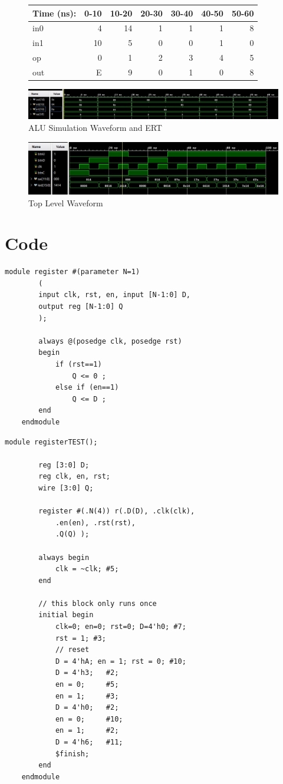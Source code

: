 \documentclass[11pt]{article}
\begin{document}
\begin{figure}[ht]\centering
	
	\begin{tabular}{l|rrrrrr}
		Time (ns): & 0-10 & 10-20 & 20-30 & 30-40 & 40-50 & 50-60 \\
		\midrule
		in0 & 4  & 14& 1 & 1 & 1 & 8 \\
		in1 & 10 & 5 & 0 & 0 & 1 & 0 \\
		op  & 0  & 1 & 2 & 3 & 4 & 5 \\
		\midrule
		out & E  & 9 & 0 & 1 & 0 & 8 \\
		\bottomrule
	\end{tabular}
	\bigskip
	\includegraphics[width=1\textwidth,angle=0,origin=c]{aluWaveform}
	\caption{ALU Simulation Waveform and ERT}
	\label{fig:sim_with_table}
\end{figure}

\begin{figure}[ht]\centering
	\includegraphics[width=1\textwidth,angle=0,origin=c]{toplevelWaveform}
	\caption{Top Level Waveform}
	\label{fig:sim_with_table}
\end{figure}
	\clearpage

\section*{Code}

\begin{lstlisting}[style=Verilog,
caption=Register Source Code,
label=MUX w/ two inputs Source Code
]
	module register #(parameter N=1) 
		(
		input clk, rst, en, input [N-1:0] D,
		output reg [N-1:0] Q
		);
		
		always @(posedge clk, posedge rst) 
		begin
			if (rst==1)
				Q <= 0 ;
			else if (en==1)
				Q <= D ;
		end
	endmodule
\end{lstlisting}

\begin{lstlisting}[style=Verilog,
caption=Register Test,
label=MUX2 Test
]
	module registerTEST();
	
		reg [3:0] D;
		reg clk, en, rst;
		wire [3:0] Q;
		
		register #(.N(4)) r(.D(D), .clk(clk),
			.en(en), .rst(rst),
			.Q(Q) );
		
		always begin 
			clk = ~clk; #5; 
		end
		
		// this block only runs once
		initial begin
			clk=0; en=0; rst=0; D=4'h0; #7;
			rst = 1; #3;
			// reset
			D = 4'hA; en = 1; rst = 0; #10;
			D = 4'h3;   #2;
			en = 0;     #5;
			en = 1;     #3;
			D = 4'h0;   #2;
			en = 0;     #10;
			en = 1;     #2;
			D = 4'h6;   #11;
			$finish;
		end 
	endmodule
\end{lstlisting}
\end{document}
